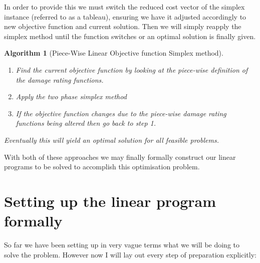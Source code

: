 \documentclass{article}
\newtheorem{algorithm}{Algorithm}[section]
\begin{document}
\par In order to provide this we must switch the reduced cost vector of the simplex instance (referred to as a tableau), ensuring we have it adjusted accordingly to new objective function and current solution. Then we will simply reapply the simplex method until the function switches or an optimal solution is finally given.

\begin{algorithm}[Piece-Wise Linear Objective function Simplex method]
~\\
    \begin{enumerate}
        \item Find the current objective function by looking at the piece-wise definition of the damage rating functions.
        \item Apply the two phase simplex method
        \item If the objective function changes due to the piece-wise damage rating functions being altered then go back to step 1.
    \end{enumerate}
    Eventually this will yield an optimal solution for all feasible problems.
\end{algorithm}

\par With both of these approaches we may finally formally construct our linear programs to be solved to accomplish this optimisation problem.

\section{Setting up the linear program formally}
\par So far we have been setting up in very vague terms what we will be doing to solve the problem. However now I will lay out every step of preparation explicitly:
\end{document}
